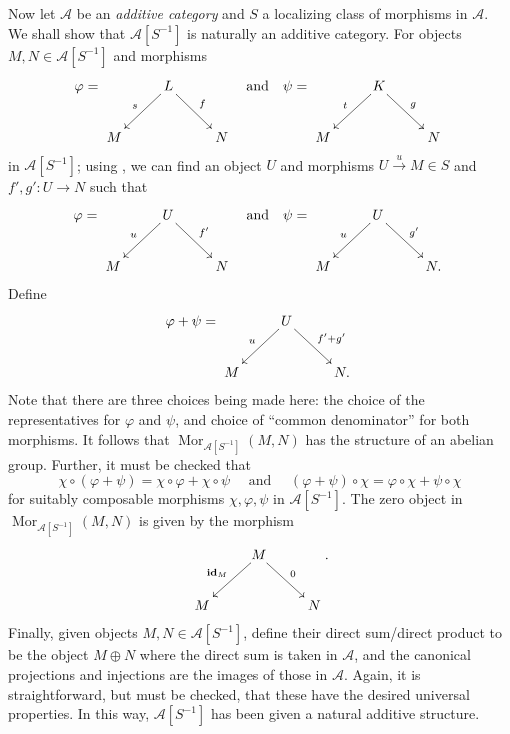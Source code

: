\documentclass[11pt]{article}
\theoremstyle{thmstyle}
\theoremstyle{defstyle}
\newcommand{\id}{\mathbf{id}}
\newcommand{\scrA}{\mathscr{A}}
\newcommand{\Mor}{\operatorname{Mor}}
\begin{document}
Now let $\scrA$ be an \emph{additive category} and $S$ a localizing class of morphisms in $\scrA$. We shall show that $\scrA[S^{-1}]$ is naturally an additive category. For objects $M, N\in\scrA[S^{-1}]$ and morphisms 
\begin{equation*}
	\varphi = \xymatrix { 
		& L\ar[ld]_s\ar[rd]^f & \\
		M & & N
	}
	\quad\text{and}\quad 
	\psi = \xymatrix {
		& K\ar[ld]_t\ar[rd]^g & \\
		M & & N
	}
\end{equation*}
in $\scrA[S^{-1}]$; using , we can find an object $U$ and morphisms $U\xrightarrow{u} M\in S$ and $f', g'\colon U\to N$ such that 
\begin{equation*}
	\varphi = \xymatrix {
		& U\ar[ld]_u\ar[rd]^{f'} & \\
		M & & N
	}\quad\text{and}\quad 
	\psi = \xymatrix {
		& U\ar[ld]_{u}\ar[rd]^{g'} & \\
		M & & N.
	}
\end{equation*}
Define 
\begin{equation*}
	\varphi + \psi = \xymatrix {
		& U\ar[ld]_u\ar[rd]^{f' + g'} & \\
		M & & N.
	}
\end{equation*}
Note that there are three choices being made here: the choice of the representatives for $\varphi$ and $\psi$, and choice of ``common denominator'' for both morphisms. It follows that $\Mor_{\scrA[S^{-1}]}(M, N)$ has the structure of an abelian group. Further, it must be checked that 
\begin{equation*}
	\chi\circ(\varphi + \psi) = \chi\circ\varphi + \chi\circ\psi\quad\text{ and }\quad(\varphi + \psi)\circ\chi = \varphi\circ\chi + \psi\circ\chi
\end{equation*}
for suitably composable morphisms $\chi,\varphi,\psi$ in $\scrA[S^{-1}]$. The zero object in $\Mor_{\scrA[S^{-1}]}(M, N)$ is given by the morphism
\begin{equation*}
	\xymatrix {
		& M\ar[ld]_{\id_M}\ar[rd]^0 & \\
		M  && N
	}.
\end{equation*}
Finally, given objects $M, N\in\scrA[S^{-1}]$, define their direct sum/direct product to be the object $M\oplus N$ where the direct sum is taken in $\scrA$, and the canonical projections and injections are the images of those in $\scrA$. Again, it is straightforward, but must be checked, that these have the desired universal properties. In this way, $\scrA[S^{-1}]$ has been given a natural additive structure.
\end{document}
